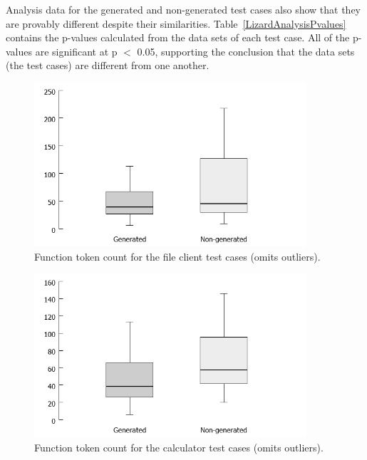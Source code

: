 \indent
Analysis data for the generated and non-generated test cases also show that they are provably different despite their similarities.  Table~\ref{LizardAnalysisPvalues} contains the p-values calculated from the data sets of each test case.  All of the p-values are significant at p $<$ 0.05, supporting the conclusion that the data sets (the test cases) are different from one another.

\begin{figure}[h!]
\centering
\includegraphics[width=0.9\textwidth]{figures/Lizard_FileClient_TokenCount.png}
\caption[Function token count for the file client test cases.]{Function token count for the file client test cases (omits outliers).}
\label{fig:Lizard_FileClient_TokenCount}
\end{figure}

\begin{figure}[h!]
\centering
\includegraphics[width=0.9\textwidth]{figures/Lizard_Calculator_TokenCount.png}
\caption[Function token count for the calculator test cases.]{Function token count for the calculator test cases (omits outliers).}
\label{fig:Lizard_Calculator_TokenCount}
\end{figure}

